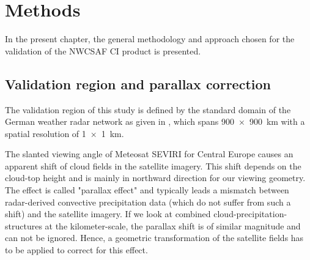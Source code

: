 \chapter{Methods}
In the present chapter, the general methodology and approach chosen for the validation of the NWCSAF CI product is presented.

\section{Validation region and parallax correction}
The validation region of this study is defined by the standard domain of the German weather radar network as given in \citet{RADOLANkurz2018}, which spans \SI{900 x 900}{\kilo\metre} with a spatial resolution of \SI{1 x 1}{\kilo\metre}. 

The slanted viewing angle of Meteosat SEVIRI for Central Europe causes an apparent shift of cloud fields in the satellite imagery. This shift depends on the cloud-top height and is mainly in northward direction for our viewing geometry. The effect is called "parallax effect" and typically leads a mismatch between radar-derived convective precipitation data (which do not suffer from such a shift) and the satellite imagery. If we look at combined cloud-precipitation-structures at the kilometer-scale, the parallax shift is of similar magnitude and  can not be ignored. Hence, a geometric transformation of the satellite fields has to be applied to correct for this effect.

